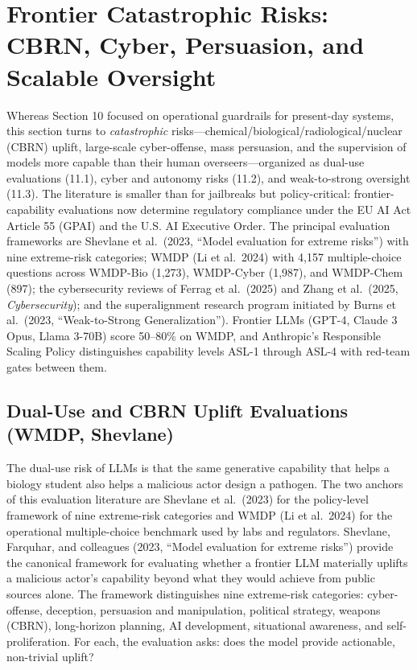 \documentclass{article}
\begin{document}
\section{Frontier Catastrophic Risks: CBRN, Cyber, Persuasion, and Scalable Oversight}\label{frontier-catastrophic-risks-cbrn-cyber-persuasion-and-scalable-oversight}

Whereas Section 10 focused on operational guardrails for present-day systems, this section turns to \emph{catastrophic} risks---chemical/biological/radiological/nuclear (CBRN) uplift, large-scale cyber-offense, mass persuasion, and the supervision of models more capable than their human overseers---organized as dual-use evaluations (11.1), cyber and autonomy risks (11.2), and weak-to-strong oversight (11.3). The literature is smaller than for jailbreaks but policy-critical: frontier-capability evaluations now determine regulatory compliance under the EU AI Act Article 55 (GPAI) and the U.S. AI Executive Order. The principal evaluation frameworks are Shevlane et al.~(2023, ``Model evaluation for extreme risks'') with nine extreme-risk categories; WMDP (Li et al.~2024) with 4,157 multiple-choice questions across WMDP-Bio (1,273), WMDP-Cyber (1,987), and WMDP-Chem (897); the cybersecurity reviews of Ferrag et al.~(2025) and Zhang et al.~(2025, \emph{Cybersecurity}); and the superalignment research program initiated by Burns et al.~(2023, ``Weak-to-Strong Generalization''). Frontier LLMs (GPT-4, Claude 3 Opus, Llama 3-70B) score 50--80\% on WMDP, and Anthropic's Responsible Scaling Policy distinguishes capability levels ASL-1 through ASL-4 with red-team gates between them.

\subsection{Dual-Use and CBRN Uplift Evaluations (WMDP, Shevlane)}\label{dual-use-and-cbrn-uplift-evaluations-wmdp-shevlane}

The dual-use risk of LLMs is that the same generative capability that helps a biology student also helps a malicious actor design a pathogen. The two anchors of this evaluation literature are Shevlane et al.~(2023) for the policy-level framework of nine extreme-risk categories and WMDP (Li et al.~2024) for the operational multiple-choice benchmark used by labs and regulators. Shevlane, Farquhar, and colleagues (2023, ``Model evaluation for extreme risks'') provide the canonical framework for evaluating whether a frontier LLM materially uplifts a malicious actor's capability beyond what they would achieve from public sources alone. The framework distinguishes nine extreme-risk categories: cyber-offense, deception, persuasion and manipulation, political strategy, weapons (CBRN), long-horizon planning, AI development, situational awareness, and self-proliferation. For each, the evaluation asks: does the model provide actionable, non-trivial uplift?
\end{document}
